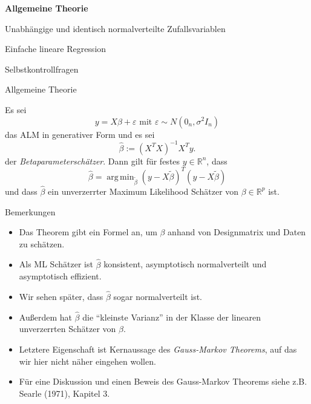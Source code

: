 \documentclass[
  8pt,
  ignorenonframetext,
]{beamer}
\providecommand{\tightlist}{%
  \setlength{\itemsep}{0pt}\setlength{\parskip}{0pt}}
\DeclareMathOperator*{\argmin}{arg\,min}
\begin{document}
\begin{frame}{}
\protect\hypertarget{section-3}{}
\large
{}
\vfill

\textbf{Allgemeine Theorie}

Unabhängige und identisch normalverteilte Zufallsvariablen

Einfache lineare Regression

Selbstkontrollfragen

\vfill
\end{frame}

\begin{frame}{Allgemeine Theorie}
\protect\hypertarget{allgemeine-theorie}{}
\footnotesize
\begin{theorem}[Betaparameterschätzer]
\justifying
\normalfont
Es sei
\begin{equation}
y = X\beta + \varepsilon \mbox{ mit } \varepsilon \sim N(0_n,\sigma^2I_n)
\end{equation}
das ALM in generativer Form und es sei
\begin{equation}
\hat{\beta} := (X^TX)^{-1}X^Ty.
\end{equation}
der \textit{Betaparameterschätzer}. Dann gilt für festes $y \in \mathbb{R}^n$, dass
\begin{equation}
\hat{\beta} = \argmin_{\tilde{\beta}} (y - X\tilde{\beta})^T(y - X\tilde{\beta})
\end{equation}
und dass $\hat{\beta}$ ein unverzerrter Maximum Likelihood Schätzer von $\beta \in \mathbb{R}^p$ ist.
\end{theorem}

Bemerkungen

\begin{itemize}
\tightlist
\item
  Das Theorem gibt ein Formel an, um \(\beta\) anhand von Designmatrix
  und Daten zu schätzen.
\item
  Als ML Schätzer ist \(\hat{\beta}\) konsistent, asymptotisch
  normalverteilt und asymptotisch effizient.
\item
  Wir sehen später, dass \(\hat{\beta}\) sogar normalverteilt ist.
\item
  Außerdem hat \(\hat{\beta}\) die ``kleinste Varianz'' in der Klasse
  der linearen unverzerrten Schätzer von \(\beta\).
\item
  Letztere Eigenschaft ist Kernaussage des
  \textit{Gauss-Markov Theorems}, auf das wir hier nicht näher eingehen
  wollen.
\item
  Für eine Diskussion und einen Beweis des Gauss-Markov Theorems siehe
  z.B. Searle (1971), Kapitel 3.
\end{itemize}
\end{frame}
\end{document}

